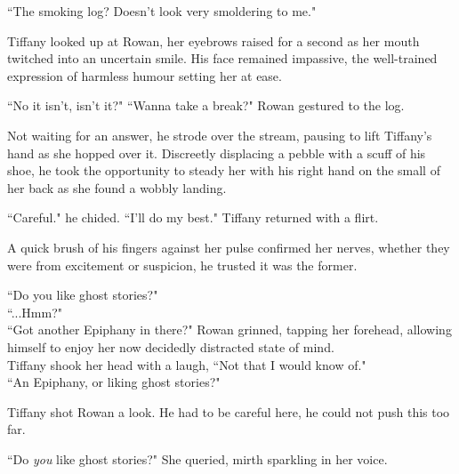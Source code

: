 ``The smoking log? Doesn't look very smoldering to me." 
\vspace{5mm}

Tiffany looked up at Rowan, her eyebrows raised for a second as her mouth twitched into an uncertain smile.
His face remained impassive, the well-trained expression of harmless humour setting her at ease.
\vspace{5mm}

``No it isn't, isn't it?"
\newline
``Wanna take a break?" Rowan gestured to the log.
\vspace{5mm}

Not waiting for an answer, he strode over the stream, pausing to lift Tiffany's hand as she hopped over it. 
Discreetly displacing a pebble with a scuff of his shoe, he took the opportunity to steady her with his right hand on the small of her back as she found a wobbly landing.
\vspace{5mm}

``Careful." he chided. 
\newline
``I'll do my best." Tiffany returned with a flirt.
\vspace{5mm}

A quick brush of his fingers against her pulse confirmed her nerves, whether they were from excitement or suspicion, he trusted it was the former.
\vspace{5mm}

``Do you like ghost stories?"\\
``...Hmm?"\\
``Got another Epiphany in there?" Rowan grinned, tapping her forehead, allowing himself to enjoy her now decidedly distracted state of mind.\\
Tiffany shook her head with a laugh, ``Not that I would know of."\\
``An Epiphany, or liking ghost stories?"
\vspace{5mm}

Tiffany shot Rowan a look. 
He had to be careful here, he could not push this too far.
\vspace{5mm}

``Do \textit{you} like ghost stories?" She queried, mirth sparkling in her voice.
\vspace{5mm}

